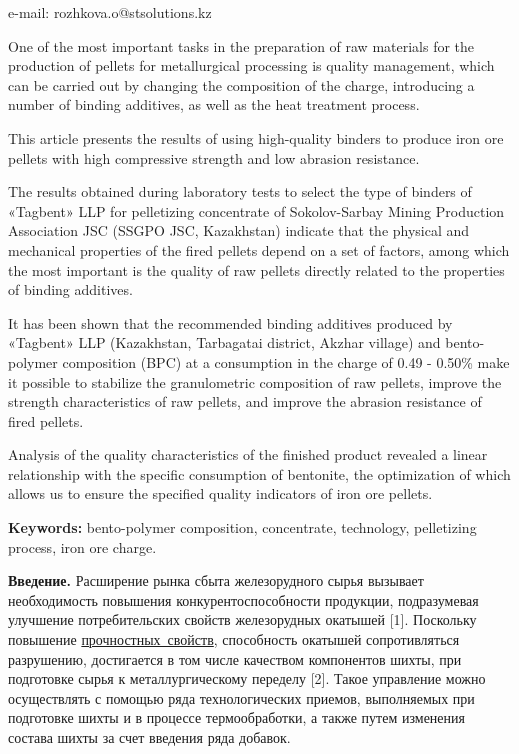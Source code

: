 e-mail: rozhkova.o@stsolutions.kz

One of the most important tasks in the preparation of raw materials for
the production of pellets for metallurgical processing is quality
management, which can be carried out by changing the composition of the
charge, introducing a number of binding additives, as well as the heat
treatment process.

This article presents the results of using high-quality binders to
produce iron ore pellets with high compressive strength and low abrasion
resistance.

The results obtained during laboratory tests to select the type of
binders of «Tagbent» LLP for pelletizing concentrate of Sokolov-Sarbay
Mining Production Association JSC (SSGPO JSC, Kazakhstan) indicate that
the physical and mechanical properties of the fired pellets depend on a
set of factors, among which the most important is the quality of raw
pellets directly related to the properties of binding additives.

It has been shown that the recommended binding additives produced by
«Tagbent» LLP (Kazakhstan, Tarbagatai district, Akzhar village) and
bento-polymer composition (BPC) at a consumption in the charge of 0.49 -
0.50\% make it possible to stabilize the granulometric composition of
raw pellets, improve the strength characteristics of raw pellets, and
improve the abrasion resistance of fired pellets.

Analysis of the quality characteristics of the finished product revealed
a linear relationship with the specific consumption of bentonite, the
optimization of which allows us to ensure the specified quality
indicators of iron ore pellets.

{\bfseries Keywords:} bento-polymer composition, concentrate, technology,
pelletizing process, iron ore charge.

{\bfseries Введение.} Расширение рынка сбыта железорудного сырья вызывает
необходимость повышения конкурентоспособности продукции, подразумевая
улучшение потребительских свойств железорудных окатышей {[}1{]}.
Поскольку повышение
\href{https://www.yandex.ru/search/?text=\%D0\%BF\%D1\%80\%D0\%BE\%D1\%87\%D0\%BD\%D0\%BE\%D1\%81\%D1\%82\%D0\%BD\%D1\%8B\%D1\%85\%20\%D1\%81\%D0\%B2\%D0\%BE\%D0\%B9\%D1\%81\%D1\%82\%D0\%B2\%20\%20&lr=213&msid=1739867152.50217765.01245.11111&search_source=chromentp_desktop&suggest_reqid=163703149161131391771529680334996&msp=1}{прочностных~свойств},
способность окатышей сопротивляться разрушению, достигается в том числе
качеством компонентов шихты, при подготовке сырья к металлургическому
переделу {[}2{]}. Такое управление можно осуществлять с помощью ряда
технологических приемов, выполняемых при подготовке шихты и в процессе
термообработки, а также путем изменения состава шихты за счет введения
ряда добавок.


